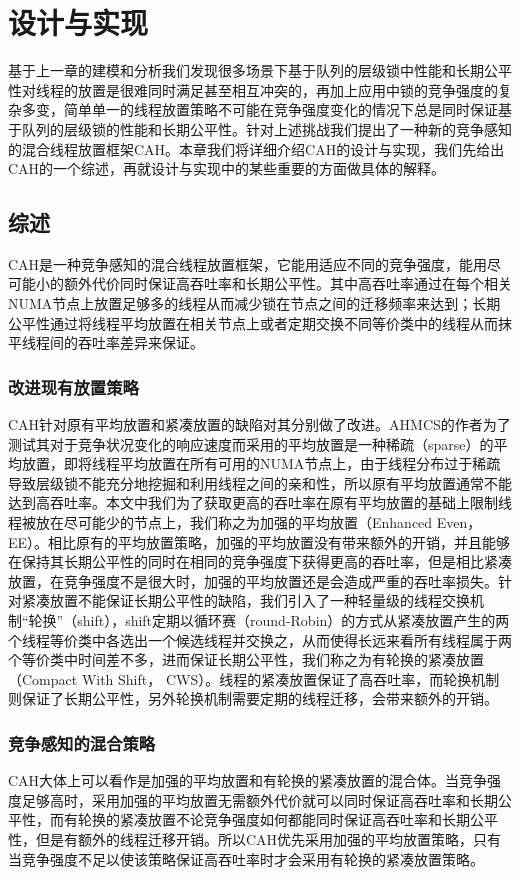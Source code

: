 \chapter{设计与实现}
\label{chap:faq}
基于上一章的建模和分析我们发现很多场景下基于队列的层级锁中性能和长期公平性对线程的放置是很难同时满足甚至相互冲突的，再加上应用中锁的竞争强度的复杂多变，简单单一的线程放置策略不可能在竞争强度变化的情况下总是同时保证基于队列的层级锁的性能和长期公平性。针对上述挑战我们提出了一种新的竞争感知的混合线程放置框架CAH。本章我们将详细介绍CAH的设计与实现，我们先给出CAH的一个综述，再就设计与实现中的某些重要的方面做具体的解释。

\section{综述}
CAH是一种竞争感知的混合线程放置框架，它能用适应不同的竞争强度，能用尽可能小的额外代价同时保证高吞吐率和长期公平性。其中高吞吐率通过在每个相关NUMA节点上放置足够多的线程从而减少锁在节点之间的迁移频率来达到；长期公平性通过将线程平均放置在相关节点上或者定期交换不同等价类中的线程从而抹平线程间的吞吐率差异来保证。

\subsection{改进现有放置策略}
CAH针对原有平均放置和紧凑放置的缺陷对其分别做了改进。AHMCS的作者为了测试其对于竞争状况变化的响应速度而采用的平均放置是一种稀疏（sparse）的平均放置，即将线程平均放置在所有可用的NUMA节点上，由于线程分布过于稀疏导致层级锁不能充分地挖掘和利用线程之间的亲和性，所以原有平均放置通常不能达到高吞吐率。本文中我们为了获取更高的吞吐率在原有平均放置的基础上限制线程被放在尽可能少的节点上，我们称之为加强的平均放置（Enhanced Even， EE）。相比原有的平均放置策略，加强的平均放置没有带来额外的开销，并且能够在保持其长期公平性的同时在相同的竞争强度下获得更高的吞吐率，但是相比紧凑放置，在竞争强度不是很大时，加强的平均放置还是会造成严重的吞吐率损失。针对紧凑放置不能保证长期公平性的缺陷，我们引入了一种轻量级的线程交换机制“轮换”（shift），shift定期以循环赛（round-Robin）的方式从紧凑放置产生的两个线程等价类中各选出一个候选线程并交换之，从而使得长远来看所有线程属于两个等价类中时间差不多，进而保证长期公平性，我们称之为有轮换的紧凑放置（Compact With Shift， CWS）。线程的紧凑放置保证了高吞吐率，而轮换机制则保证了长期公平性，另外轮换机制需要定期的线程迁移，会带来额外的开销。

\subsection{竞争感知的混合策略}
CAH大体上可以看作是加强的平均放置和有轮换的紧凑放置的混合体。当竞争强度足够高时，采用加强的平均放置无需额外代价就可以同时保证高吞吐率和长期公平性，而有轮换的紧凑放置不论竞争强度如何都能同时保证高吞吐率和长期公平性，但是有额外的线程迁移开销。所以CAH优先采用加强的平均放置策略，只有当竞争强度不足以使该策略保证高吞吐率时才会采用有轮换的紧凑放置策略。

